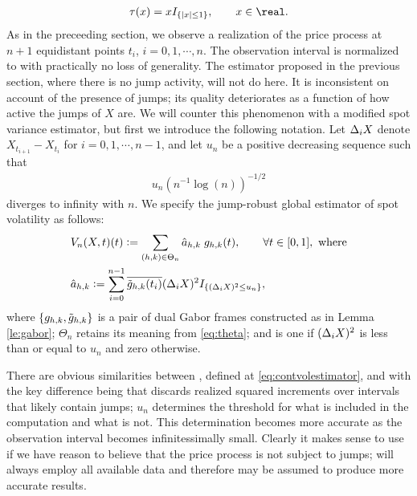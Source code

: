 \begin{align}
  \tau(x) = xI_{\{\vert x \vert \le 1\}}, \qquad x \in \real. \notag
  \label{}
\end{align}
As in the preceeding section, we observe a realization of the price process at $n + 1$ equidistant points $t_i$,  $i = 0, 1, \cdots, n$. The observation interval is normalized to \domain with practically no loss of generality.  The estimator proposed in the previous section, where there is no jump activity, will not do here. It is inconsistent on account of the presence of jumps; its quality deteriorates as a function of how active the jumps of $X$ are. We will counter this phenomenon with a modified spot variance estimator, but first we introduce the following notation. Let $\Delta_i X$ denote $X_{t_{i+1}} - X_{t_i}$ for $i = 0, 1,\cdots, n-1$, and let $u_n$  be a positive decreasing sequence such that 
\begin{align}
  u_n (n^{-1} \log(n))^{-1/2} 
  \label{}
\end{align}
 diverges to infinity with $n$. We specify the jump-robust global estimator of  spot volatility as follows: 
\begin{align}
  \label{eq:jumpvolestimator}
  &V_n(X, t)(t) := \sum_{(h,k) \in \Theta_n} \hat{a}_{h,k}\;g_{h,k}(t), \qquad \forall t \in [0,1], \text{ where}\\
  &\hat{a}_{h,k} := \sum_{i =0}^{n-1} \overline{\tilde{g}_{h,k}(t_i)} (\Delta_i X)^2 I_{\{(\Delta_i X)^2 \le u_n\}},
\end{align}
where $\{g_{h,k}, \tilde{g}_{h,k}\}$ is a pair of dual Gabor frames constructed as in Lemma \eqref{le:gabor}; $\Theta_n$ retains its meaning from \eqref{eq:theta}; and \indx is one if $(\Delta_i X)^2$ is less than or equal to  $u_n$ and zero otherwise.  


There are obvious similarities between \svnx, defined at  \eqref{eq:contvolestimator},  and \jvn with the key difference being that \jvn discards realized squared increments over intervals that likely contain jumps; $u_n$ determines the threshold for what is included in the computation and what is not. This determination becomes more accurate as the observation interval becomes infinitessimally small. Clearly it makes sense to use \svnx if we have reason to believe that the price process is not subject to jumps; \svnx will always employ   all available data and therefore may be assumed to produce more accurate results.  


